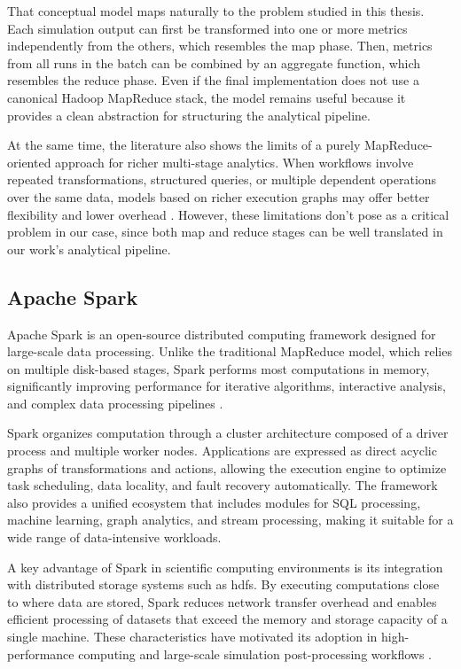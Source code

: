 That conceptual model maps naturally to the problem studied in this thesis. Each simulation output can first be transformed into one or more metrics independently from the others, which resembles the map phase. Then, metrics from all runs in the batch can be combined by an aggregate function, which resembles the reduce phase. Even if the final implementation does not use a canonical Hadoop MapReduce stack, the model remains useful because it provides a clean abstraction for structuring the analytical pipeline.

At the same time, the literature also shows the limits of a purely MapReduce-oriented approach for richer multi-stage analytics. When workflows involve repeated transformations, structured queries, or multiple dependent operations over the same data, models based on richer execution graphs may offer better flexibility and lower overhead \parencite{zaharia2012rdd}. However, these limitations don't pose as a critical problem in our case, since both map and reduce stages can be well translated in our work's analytical pipeline.

\subsection{Apache Spark}
\label{subsec:cap2-apache-spark}

Apache Spark is an open-source distributed computing framework designed for large-scale data processing. Unlike the traditional MapReduce model, which relies on multiple disk-based stages, Spark performs most computations in memory, significantly improving performance for iterative algorithms, interactive analysis, and complex data processing pipelines \parencite{zaharia2012rdd,sparkpysparkdocs}.

Spark organizes computation through a cluster architecture composed of a driver process and multiple worker nodes. Applications are expressed as direct acyclic graphs of transformations and actions, allowing the execution engine to optimize task scheduling, data locality, and fault recovery automatically. The framework also provides a unified ecosystem that includes modules for SQL processing, machine learning, graph analytics, and stream processing, making it suitable for a wide range of data-intensive workloads.

A key advantage of Spark in scientific computing environments is its integration with distributed storage systems such as \gls{hdfs}. By executing computations close to where data are stored, Spark reduces network transfer overhead and enables efficient processing of datasets that exceed the memory and storage capacity of a single machine. These characteristics have motivated its adoption in high-performance computing and large-scale simulation post-processing workflows \parencite{li2018postprocessing}.

